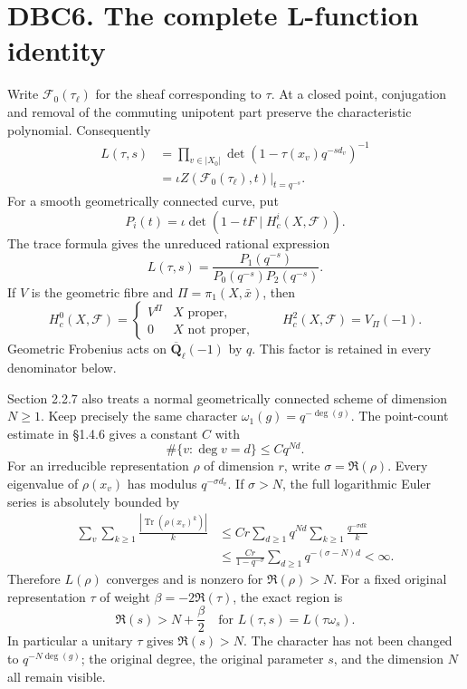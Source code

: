 \documentclass[
]{report}
\begin{document}
\section{DBC6. The complete L-function
identity}\label{dbc6.-the-complete-l-function-identity}

Write \(\mathcal F_0(\tau_\ell)\) for the sheaf corresponding to
\(\tau\). At a closed point, conjugation and removal of the commuting
unipotent part preserve the characteristic polynomial. Consequently \[
\begin{aligned}
L(\tau,s)
&=\prod_{v\in|X_0|}
 \det(1-\tau(x_v)q^{-s d_v})^{-1}\\
&=\left.\iota Z(\mathcal F_0(\tau_\ell),t)\right|_{t=q^{-s}}.
\end{aligned}
\tag{DBC.6.1}
\] For a smooth geometrically connected curve, put \[
P_i(t)=\iota\det(1-tF\mid H_c^i(X,\mathcal F)).
\] The trace formula gives the unreduced rational expression \[
\boxed{L(\tau,s)=\frac{P_1(q^{-s})}
 {P_0(q^{-s})P_2(q^{-s})}.}
\tag{DBC.6.2}
\] If \(V\) is the geometric fibre and \(\Pi=\pi_1(X,\bar x)\), then \[
H_c^0(X,\mathcal F)=
\begin{cases}V^\Pi&X\text{ proper},\\0&X\text{ not proper},\end{cases}
\qquad
H_c^2(X,\mathcal F)=V_\Pi(-1).
\tag{DBC.6.3}
\] Geometric Frobenius acts on \(\overline{\mathbf Q}_\ell(-1)\) by
\(q\). This factor is retained in every denominator below.

Section 2.2.7 also treats a normal geometrically connected scheme of
dimension \(N\ge1\). Keep precisely the same character
\(\omega_1(g)=q^{-\deg(g)}\). The point-count estimate in §1.4.6 gives a
constant \(C\) with \[
\#\{v:\deg v=d\}\le Cq^{Nd}.
\] For an irreducible representation \(\rho\) of dimension \(r\), write
\(\sigma=\Re(\rho)\). Every eigenvalue of \(\rho(x_v)\) has modulus
\(q^{-\sigma d_v}\). If \(\sigma>N\), the full logarithmic Euler series
is absolutely bounded by \[
\begin{aligned}
\sum_v\sum_{k\ge1}\frac{|\operatorname{Tr}(\rho(x_v)^k)|}{k}
&\le Cr\sum_{d\ge1}q^{Nd}\sum_{k\ge1}\frac{q^{-\sigma dk}}{k}\\
&\le\frac{Cr}{1-q^{-\sigma}}\sum_{d\ge1}q^{-(\sigma-N)d}<\infty.
\end{aligned}
\tag{DBC.6.4}
\] Therefore \(L(\rho)\) converges and is nonzero for \(\Re(\rho)>N\).
For a fixed original representation \(\tau\) of weight
\(\beta=-2\Re(\tau)\), the exact region is \[
\Re(s)>N+\frac\beta2
\quad\text{for }L(\tau,s)=L(\tau\omega_s).
\tag{DBC.6.5}
\] In particular a unitary \(\tau\) gives \(\Re(s)>N\). The character
has not been changed to \(q^{-N\deg(g)}\); the original degree, the
original parameter \(s\), and the dimension \(N\) all remain visible.
\end{document}
